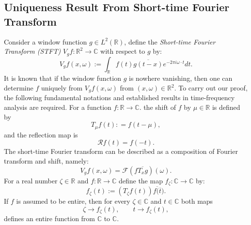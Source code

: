 \documentclass[graybox]{svmult}
\newcommand{\R}{\mathbb{R}}
\newcommand{\C}{\mathbb{C}}
\newcommand{\cR}{\mathcal{R}}
\begin{document}
\subsection{Uniqueness Result From Short-time Fourier Transform}
Consider a window function $g \in L^2(\R)$, define the \textit{Short-time Fourier Transform (STFT)}  $V_gf: \R^{2} \to \C$ with respect to $g$ by:
\begin{equation*}
    V_g f(x,\omega) := \int_{\R} f(t) \overline{g(t-x)} e^{-2 \pi i \omega \cdot t}dt.
\end{equation*}
It is known that if the window function $g$ is nowhere vanishing, then one can determine $f$ uniquely from $V_gf(x,\omega)$ from $(x,\omega)\in \R^{2}$. To carry out our proof, the following fundamental notations and established results in time-frequency analysis are required. For a function $f: \R \to \C$. the shift of $f$ by $\mu\in \R$ is defined by
\begin{equation*}
    T_\mu f(t): =f(t-\mu),
\end{equation*}
and the reflection map is
\begin{equation*}
    \cR f(t)= f(-t).
\end{equation*}
The short-time Fourier transform can be described as a composition of Fourier transform and shift, namely:
\begin{equation*}
    V_gf(x,\omega) = \mathcal{F}(f\overline{T_x g})(\omega).
\end{equation*}
For a real number $\zeta \in \R$ and $f: \R \to \C$ define the map $f_\zeta: \C \to \C$ by:
\begin{equation*} 
    f_\zeta(t):= (T_{\zeta} f(t))\overline{f(\overline{t}}).
\end{equation*}
If $f$ is assumed to be entire, then for every $\zeta \in \C$ and $t \in \C$ both maps
\begin{equation*}
    \zeta \to f_{\zeta}(t), \quad \quad t \to f_{\zeta}(t),
\end{equation*}
defines an entire function from $\C$ to $\C$.\\
\end{document}
